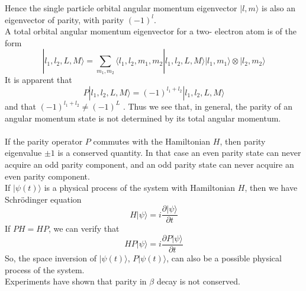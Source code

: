 Hence the single particle orbital angular momentum eigenvector $|l,m\rangle$ is also an eigenvector of parity, with parity $(-1)^l$.\\
A total orbital angular momentum eigenvector for a two-
electron atom is of the form
\[|l_1,l_2,L,M\rangle = \sum_{m_1,m_2}  \langle l_1,l_2,m_1,m_2 | l_1,l_2,L,M\rangle |l_1,m_1\rangle \otimes |l_2,m_2\rangle\]
It is apparent that
\[P|l_1,l_2,L,M\rangle = (-1)^{l_1+l_2}|l_1,l_2,L,M\rangle\]
and that $(-1)^{l_1+l_2} \neq (-1)^{L}$ . Thus we see that, in general, the parity of an angular momentum state is not determined by its total angular momentum.\\ \\
If the parity operator $P$ commutes with the Hamiltonian $H$, then parity eigenvalue $\pm 1$ is a conserved quantity. In that case an even parity state can never acquire an odd parity component, and an odd parity state can never acquire an even parity component. \\
If $|\psi(t)\rangle$ is a physical process of the system with Hamiltonian $H$, then we have Schrödinger equation 
\[H|\psi\rangle = i\frac{\partial |\psi\rangle }{\partial t}\]
If $PH = HP$, we can verify that
\[H P|\psi\rangle = i\frac{\partial P |\psi\rangle }{\partial t}\]
So, the space inversion of $|\psi(t)\rangle$, $P|\psi(t)\rangle$, can also be a possible physical process of the system.\\
Experiments have shown that parity in $\beta$ decay is not conserved.


